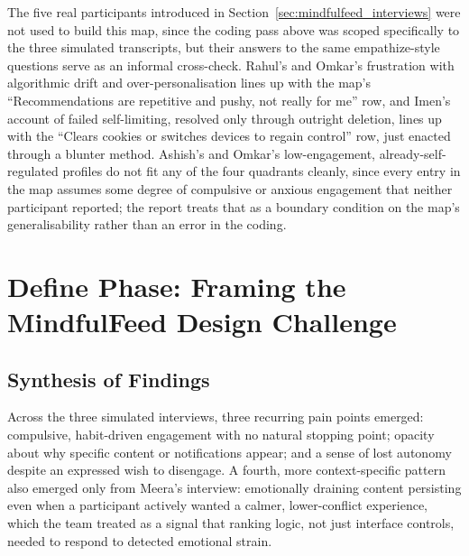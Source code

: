 \documentclass[11pt]{article}
\begin{document}
The five real participants introduced in Section~\ref{sec:mindfulfeed_interviews} were not used to build this map, since the coding pass above was scoped specifically to the three simulated transcripts, but their answers to the same empathize-style questions serve as an informal cross-check. Rahul's and Omkar's frustration with algorithmic drift and over-personalisation lines up with the map's ``Recommendations are repetitive and pushy, not really for me'' row, and Imen's account of failed self-limiting, resolved only through outright deletion, lines up with the ``Clears cookies or switches devices to regain control'' row, just enacted through a blunter method. Ashish's and Omkar's low-engagement, already-self-regulated profiles do not fit any of the four quadrants cleanly, since every entry in the map assumes some degree of compulsive or anxious engagement that neither participant reported; the report treats that as a boundary condition on the map's generalisability rather than an error in the coding.

\section{Define Phase: Framing the MindfulFeed Design Challenge}

\subsection{Synthesis of Findings}
Across the three simulated interviews, three recurring pain points emerged: compulsive, habit-driven engagement with no natural stopping point; opacity about why specific content or notifications appear; and a sense of lost autonomy despite an expressed wish to disengage. A fourth, more context-specific pattern also emerged only from Meera's interview: emotionally draining content persisting even when a participant actively wanted a calmer, lower-conflict experience, which the team treated as a signal that ranking logic, not just interface controls, needed to respond to detected emotional strain.
\end{document}
